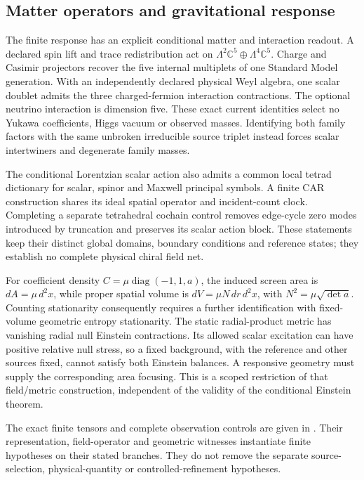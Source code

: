 \subsection*{Matter operators and gravitational response}

The finite response has an explicit conditional matter and interaction
readout. A declared spin lift and trace redistribution act on
\(\Lambda^2\mathbb C^5\oplus\Lambda^4\mathbb C^5\). Charge and Casimir
projectors recover the five internal multiplets of one Standard Model
generation. With an independently declared physical Weyl algebra, one
scalar doublet admits the three charged-fermion interaction contractions.
The optional neutrino interaction is dimension five. These exact current
identities select no Yukawa coefficients, Higgs vacuum or observed masses.
Identifying both family factors with the same unbroken irreducible source
triplet instead forces scalar intertwiners and degenerate family masses.

The conditional Lorentzian scalar action also admits a common local tetrad
dictionary for scalar, spinor and Maxwell principal symbols. A finite CAR
construction shares its ideal spatial operator and incident-count clock.
Completing a separate tetrahedral cochain control removes edge-cycle zero
modes introduced by truncation and preserves its scalar action block.
These statements keep their distinct global domains, boundary conditions
and reference states; they establish no complete physical chiral field net.

For coefficient density \(C=\mu\operatorname{diag}(-1,1,a)\), the induced
screen area is \(dA=\mu\,d^2x\), while proper spatial volume is
\(dV=\mu N\,dr\,d^2x\), with \(N^2=\mu\sqrt{\det a}\).
Counting stationarity consequently requires a further identification with
fixed-volume geometric entropy stationarity. The static radial-product
metric has vanishing radial null Einstein contractions. Its allowed scalar
excitation can have positive relative null stress, so a fixed background,
with the reference and other sources fixed, cannot satisfy both Einstein
balances. A responsive geometry must supply the corresponding area focusing.
This is a scoped restriction of that field/metric construction, independent
of the validity of the conditional Einstein theorem.

The exact finite tensors and complete observation controls are given in
. Their representation, field-operator and
geometric witnesses instantiate finite hypotheses on their stated branches.
They do not remove the separate source-selection, physical-quantity or
controlled-refinement hypotheses.
